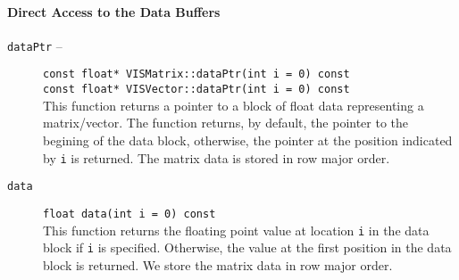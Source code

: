 \paragraph{Direct Access to the Data Buffers}
\begin{description}
\item[{\tt dataPtr} --]
{\tt const float* VISMatrix::dataPtr(int i = 0) const}\\ {\tt const 
float* VISVector::dataPtr(int i = 0) const}\\ This function returns a 
pointer to a block of float data representing a matrix/vector.  The 
function returns, by default, the pointer to the begining of the data 
block, otherwise, the pointer at the position indicated by {\tt i} is 
returned.  The matrix data is stored in row major order.
\item[{\tt data}] {\tt float data(int i = 0) const}\\
This function returns the floating point value at location {\tt i}
in the data block if {\tt i} is specified.
Otherwise, the value at the first position in the data block is returned.
We store the matrix data in row major order.
\end{description}

